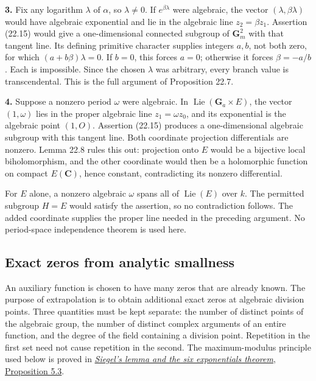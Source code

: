 \documentclass[
  11pt,
  a4paper,
]{article}
\begin{document}
\textbf{3.} Fix any logarithm \(\lambda\) of \(\alpha\), so
\(\lambda\ne0\). If \(e^{\beta\lambda}\) were algebraic, the vector
\((\lambda,\beta\lambda)\) would have algebraic exponential and lie in
the algebraic line \(z_2=\beta z_1\). Assertion (22.15) would give a
one-dimensional connected subgroup of \(\mathbf G_m^2\) with that
tangent line. Its defining primitive character supplies integers
\(a,b\), not both zero, for which \((a+b\beta)\lambda=0\). If \(b=0\),
this forces \(a=0\); otherwise it forces \(\beta=-a/b\). Each is
impossible. Since the chosen \(\lambda\) was arbitrary, every branch
value is transcendental. This is the full argument of Proposition 22.7.

\textbf{4.} Suppose a nonzero period \(\omega\) were algebraic. In
\(\operatorname{Lie}(\mathbf G_a\times E)\), the vector \((1,\omega)\)
lies in the proper algebraic line \(z_1=\omega z_0\), and its
exponential is the algebraic point \((1,O)\). Assertion (22.15) produces
a one-dimensional algebraic subgroup with this tangent line. Both
coordinate projection differentials are nonzero. Lemma 22.8 rules this
out: projection onto \(E\) would be a bijective local biholomorphism,
and the other coordinate would then be a holomorphic function on compact
\(E(\mathbf C)\), hence constant, contradicting its nonzero
differential.

For \(E\) alone, a nonzero algebraic \(\omega\) spans all of
\(\operatorname{Lie}(E)\) over \(k\). The permitted subgroup \(H=E\)
would satisfy the assertion, so no contradiction follows. The added
coordinate supplies the proper line needed in the preceding argument. No
period-space independence theorem is used here.

\subsection{Exact zeros from analytic
smallness}\label{exact-zeros-from-analytic-smallness}

An auxiliary function is chosen to have many zeros that are already
known. The purpose of extrapolation is to obtain additional exact zeros
at algebraic division points. Three quantities must be kept separate:
the number of distinct points of the algebraic group, the number of
distinct complex arguments of an entire function, and the degree of the
field containing a division point. Repetition in the first set need not
cause repetition in the second. The maximum-modulus principle used below
is proved in
\href{https://kokunoyumeto.github.io/open-math-courses-public/courses/TR-TRANS/TR-TRANS-05.html\#proposition-5-3-maximum-modulus}{\emph{Siegel's
lemma and the six exponentials theorem}, Proposition 5.3}.
\end{document}

